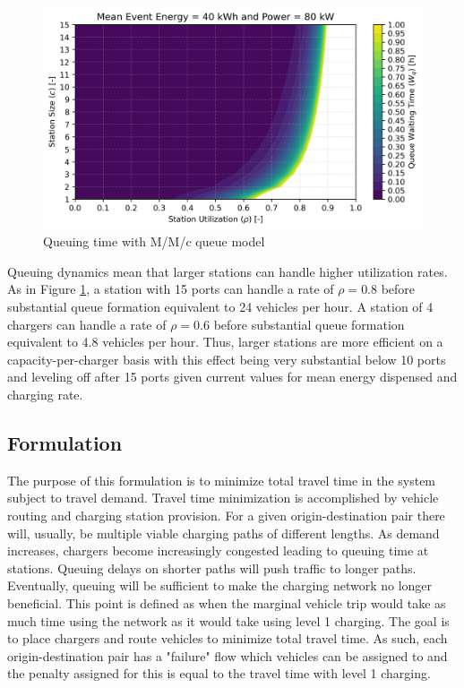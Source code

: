 \begin{figure}[H]
	\centering
	\includegraphics[width = .7\linewidth]{./figures/formulation/queue.png}
	\caption{Queuing time with M/M/c queue model}
	\label{fig:queue}
\end{figure}

Queuing dynamics mean that larger stations can handle higher utilization rates. As in Figure \ref{fig:queue}, a station with 15 ports can handle a rate of $\rho = 0.8$ before substantial queue formation equivalent to 24 vehicles per hour. A station of 4 chargers can handle a rate of $\rho = 0.6$ before substantial queue formation equivalent to 4.8 vehicles per hour. Thus, larger stations are more efficient on a capacity-per-charger basis with this effect being very substantial below 10 ports and leveling off after 15 ports given current values for mean energy dispensed and charging rate.

\subsection{Formulation}

The purpose of this formulation is to minimize total travel time in the system subject to travel demand. Travel time minimization is accomplished by vehicle routing and charging station provision. For a given origin-destination pair there will, usually, be multiple viable charging paths of different lengths. As demand increases, chargers become increasingly congested leading to queuing time at stations. Queuing delays on shorter paths will push traffic to longer paths. Eventually, queuing will be sufficient to make the charging network no longer beneficial. This point is defined as when the marginal vehicle trip would take as much time using the network as it would take using level 1 charging. The goal is to place chargers and route vehicles to minimize total travel time. As such, each origin-destination pair has a "failure" flow which vehicles can be assigned to and the penalty assigned for this is equal to the travel time with level 1 charging.

